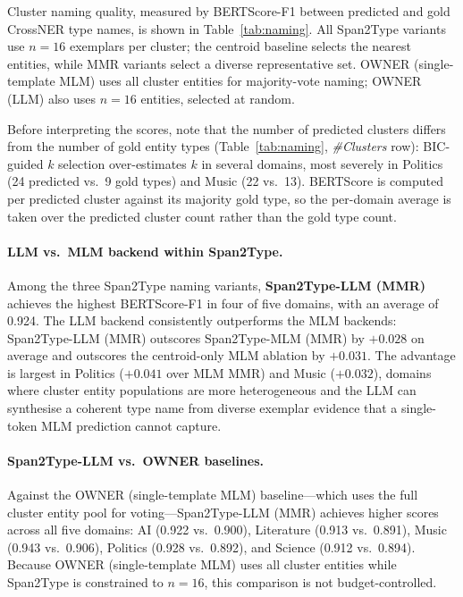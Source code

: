 \documentclass[14pt]{extreport}
\begin{document}
Cluster naming quality, measured by BERTScore-F1 between predicted and gold CrossNER type names, is shown in Table~\ref{tab:naming}.
All Span2Type variants use $n{=}16$ exemplars per cluster; the centroid baseline selects the nearest entities, while MMR variants select a diverse representative set.
OWNER (single-template MLM) uses all cluster entities for majority-vote naming; OWNER (LLM) also uses $n{=}16$ entities, selected at random.

Before interpreting the scores, note that the number of predicted clusters differs from the number of gold entity types (Table~\ref{tab:naming}, \textit{\#Clusters} row): BIC-guided $k$ selection over-estimates $k$ in several domains, most severely in Politics (24 predicted vs.\ 9 gold types) and Music (22 vs.\ 13).
BERTScore is computed per predicted cluster against its majority gold type, so the per-domain average is taken over the predicted cluster count rather than the gold type count.

\FloatBarrier



\FloatBarrier

\paragraph{LLM vs.\ MLM backend within Span2Type.}
Among the three Span2Type naming variants, \textbf{Span2Type-LLM (MMR)} achieves the highest BERTScore-F1 in four of five domains, with an average of 0.924.
The LLM backend consistently outperforms the MLM backends: Span2Type-LLM (MMR) outscores Span2Type-MLM (MMR) by $+0.028$ on average and outscores the centroid-only MLM ablation by $+0.031$.
The advantage is largest in Politics ($+0.041$ over MLM MMR) and Music ($+0.032$), domains where cluster entity populations are more heterogeneous and the LLM can synthesise a coherent type name from diverse exemplar evidence that a single-token MLM prediction cannot capture.

\paragraph{Span2Type-LLM vs.\ OWNER baselines.}
Against the OWNER (single-template MLM) baseline---which uses the full cluster entity pool for voting---Span2Type-LLM (MMR) achieves higher scores across all five domains: AI (0.922 vs.\ 0.900), Literature (0.913 vs.\ 0.891), Music (0.943 vs.\ 0.906), Politics (0.928 vs.\ 0.892), and Science (0.912 vs.\ 0.894).
Because OWNER (single-template MLM) uses all cluster entities while Span2Type is constrained to $n{=}16$, this comparison is not budget-controlled.
\end{document}
